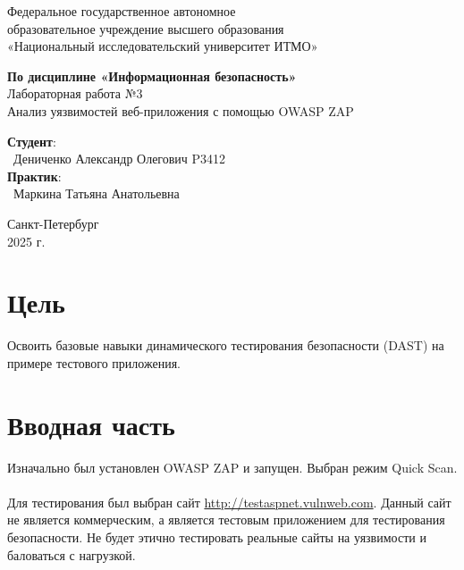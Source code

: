 \documentclass{article}
\begin{document}
\begin{center}
    \Large
    Федеральное государственное автономное \\
    образовательное учреждение высшего образования \\ 
    «Национальный исследовательский университет ИТМО»\\
    \vspace{0.5cm}
    \large
    
    \vspace{1cm}
    \Large
    \textbf{По дисциплине «Информационная безопасность»} \\
        Лабораторная работа №3\\
        Анализ уязвимостей веб-приложения с
помощью OWASP ZAP
    \large
    \vspace{8cm}

    \begin{minipage}{.33\textwidth}
    \end{minipage}
    \hfill
    \begin{minipage}{.4\textwidth}
    
        \textbf{Студент}: \vspace{.1cm} \\
        \ Дениченко Александр Олегович P3412\\
        \textbf{Практик}:  \\
        \ Маркина Татьяна Анатольевна
    \end{minipage}
    \vfill
Санкт-Петербург\\ 2025 г.
\end{center}
\pagestyle{empty}
\newpage
\pagestyle{plain}

\section*{Цель}

Освоить базовые навыки динамического тестирования безопасности (DAST) на
примере тестового приложения.

\section{Вводная часть}

Изначально был установлен OWASP ZAP и запущен. Выбран режим Quick Scan.
\\ \\
Для тестирования был выбран сайт \href{http://testaspnet.vulnweb.com}{http://testaspnet.vulnweb.com}. Данный сайт не является коммерческим, а является тестовым приложением для тестирования безопасности.
Не будет этично тестировать реальные сайты на уязвимости и баловаться с нагрузкой.
\end{document}
